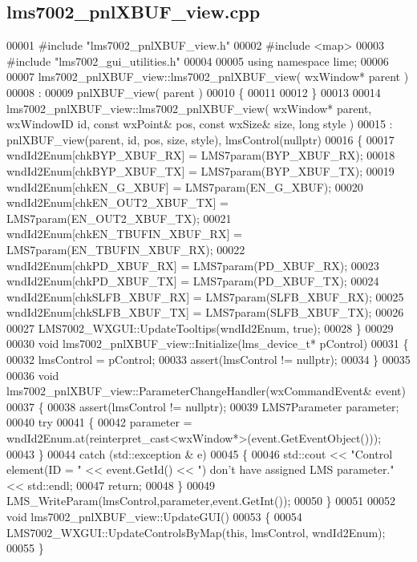 \subsection{lms7002\+\_\+pnl\+X\+B\+U\+F\+\_\+view.\+cpp}
\label{lms7002__pnlXBUF__view_8cpp_source}

\begin{DoxyCode}
00001 \textcolor{preprocessor}{#include "lms7002_pnlXBUF_view.h"}
00002 \textcolor{preprocessor}{#include <map>}
00003 \textcolor{preprocessor}{#include "lms7002_gui_utilities.h"}
00004 
00005 \textcolor{keyword}{using namespace }lime;
00006 
00007 lms7002_pnlXBUF_view::lms7002_pnlXBUF_view( wxWindow* parent )
00008 :
00009 pnlXBUF_view( parent )
00010 \{
00011 
00012 \}
00013 
00014 lms7002_pnlXBUF_view::lms7002_pnlXBUF_view( wxWindow* parent, wxWindowID \textcolor{keywordtype}{id}, \textcolor{keyword}{const} wxPoint& pos, \textcolor{keyword}{const} 
      wxSize& size, \textcolor{keywordtype}{long} style )
00015     : pnlXBUF_view(parent, id, pos, size, style), lmsControl(nullptr)
00016 \{
00017     wndId2Enum[chkBYP_XBUF_RX] = LMS7param(BYP_XBUF_RX);
00018     wndId2Enum[chkBYP_XBUF_TX] = LMS7param(BYP_XBUF_TX);
00019     wndId2Enum[chkEN_G_XBUF] = LMS7param(EN_G_XBUF);
00020     wndId2Enum[chkEN_OUT2_XBUF_TX] = LMS7param(EN_OUT2_XBUF_TX);
00021     wndId2Enum[chkEN_TBUFIN_XBUF_RX] = LMS7param(EN_TBUFIN_XBUF_RX);
00022     wndId2Enum[chkPD_XBUF_RX] = LMS7param(PD_XBUF_RX);
00023     wndId2Enum[chkPD_XBUF_TX] = LMS7param(PD_XBUF_TX);
00024     wndId2Enum[chkSLFB_XBUF_RX] = LMS7param(SLFB_XBUF_RX);
00025     wndId2Enum[chkSLFB_XBUF_TX] = LMS7param(SLFB_XBUF_TX);
00026 
00027     LMS7002_WXGUI::UpdateTooltips(wndId2Enum, \textcolor{keyword}{true});
00028 \}
00029 
00030 \textcolor{keywordtype}{void} lms7002_pnlXBUF_view::Initialize(lms_device_t* pControl)
00031 \{
00032     lmsControl = pControl;
00033     assert(lmsControl != \textcolor{keyword}{nullptr});
00034 \}
00035 
00036 \textcolor{keywordtype}{void} lms7002_pnlXBUF_view::ParameterChangeHandler(wxCommandEvent& event)
00037 \{
00038     assert(lmsControl != \textcolor{keyword}{nullptr});
00039     LMS7Parameter parameter;
00040     \textcolor{keywordflow}{try}
00041     \{
00042         parameter = wndId2Enum.at(reinterpret\_cast<wxWindow*>(event.GetEventObject()));
00043     \}
00044     \textcolor{keywordflow}{catch} (std::exception & e)
00045     \{
00046         std::cout << \textcolor{stringliteral}{"Control element(ID = "} << \textcolor{keyword}{event}.GetId() << \textcolor{stringliteral}{") don't have assigned LMS parameter."} << 
      std::endl;
00047         \textcolor{keywordflow}{return};
00048     \}
00049     LMS_WriteParam(lmsControl,parameter,event.GetInt());
00050 \}
00051 
00052 \textcolor{keywordtype}{void} lms7002_pnlXBUF_view::UpdateGUI()
00053 \{
00054     LMS7002_WXGUI::UpdateControlsByMap(\textcolor{keyword}{this}, lmsControl, wndId2Enum);
00055 \}
\end{DoxyCode}
